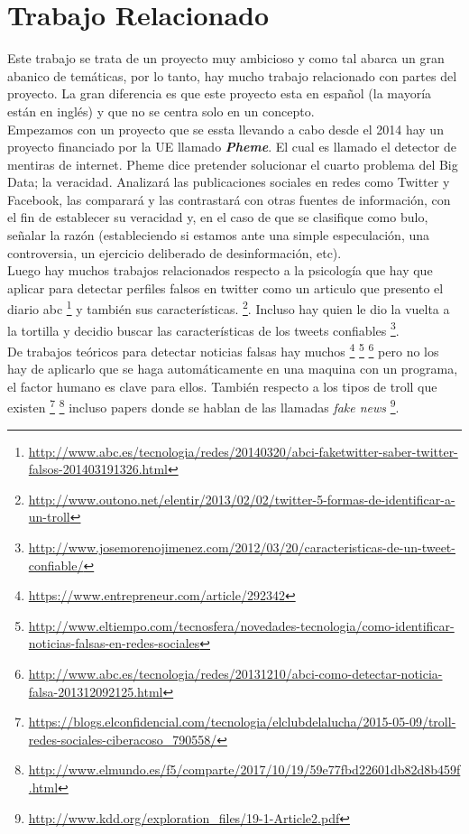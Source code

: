 \documentclass[../all.tex]{subfiles}
\begin{document}
\section{Trabajo Relacionado} %
    
    Este trabajo se trata de un proyecto muy ambicioso y como tal abarca un gran abanico de temáticas, por lo tanto, hay mucho trabajo relacionado con partes del proyecto. La gran diferencia es que este proyecto esta en español (la mayoría están en inglés) y que no se centra solo en un concepto.\\

    Empezamos con un proyecto que se essta llevando a cabo desde el 2014 hay un proyecto financiado por la UE llamado \textbf{\textit{Pheme}}. El cual es llamado el detector de mentiras de internet. Pheme dice pretender solucionar el cuarto problema del Big Data; la veracidad. Analizará las publicaciones sociales en redes como Twitter y Facebook, las comparará y las contrastará con otras fuentes de información, con el fin de establecer su veracidad y, en el caso de que se clasifique como bulo, señalar la razón (estableciendo si estamos ante una simple especulación, una controversia, un ejercicio deliberado de desinformación, etc).\\

    Luego hay muchos trabajos relacionados respecto a la psicología que hay que aplicar para detectar perfiles falsos en twitter como un articulo que presento el diario abc 
    \footnote{\url{http://www.abc.es/tecnologia/redes/20140320/abci-faketwitter-saber-twitter-falsos-201403191326.html}} y también sus características.
    \footnote{\url{http://www.outono.net/elentir/2013/02/02/twitter-5-formas-de-identificar-a-un-troll}}. Incluso hay quien le dio la vuelta a la tortilla y decidio buscar las características de los tweets confiables \footnote{\url{http://www.josemorenojimenez.com/2012/03/20/caracteristicas-de-un-tweet-confiable/}}.\\

    De trabajos teóricos para detectar noticias falsas hay muchos
    \footnote{\url{https://www.entrepreneur.com/article/292342}}
    \footnote{\url{http://www.eltiempo.com/tecnosfera/novedades-tecnologia/como-identificar-noticias-falsas-en-redes-sociales}}
    \footnote{\url{http://www.abc.es/tecnologia/redes/20131210/abci-como-detectar-noticia-falsa-201312092125.html}} pero no los hay de aplicarlo que se haga automáticamente en una maquina con un programa, el factor humano es clave para ellos. También respecto a los tipos de troll que existen \footnote{\url{https://blogs.elconfidencial.com/tecnologia/elclubdelalucha/2015-05-09/troll-redes-sociales-ciberacoso_790558/}}
    \footnote{\url{http://www.elmundo.es/f5/comparte/2017/10/19/59e77fbd22601db82d8b459f.html}} incluso papers donde se hablan de las llamadas \textit{fake news} \footnote{\url{http://www.kdd.org/exploration_files/19-1-Article2.pdf}}.\\
\end{document}
